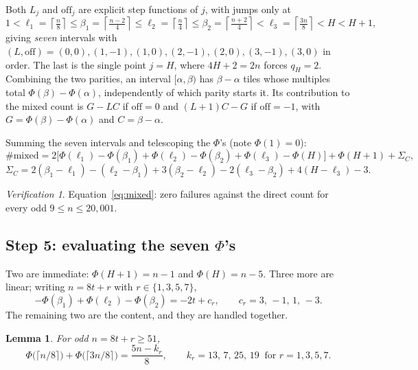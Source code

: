 \documentclass[11pt,reqno]{amsart}
\theoremstyle{plain}
\newtheorem*{lemma}{Lemma}
\theoremstyle{remark}
\newtheorem*{verification}{Verification}
\numberwithin{equation}{section}
\begin{document}
Both $L_j$ and $\mathrm{off}_j$ are explicit step functions of $j$, with jumps
only at
\[
  1 < \ell_1 = \left\lceil \tfrac{n}{8}\right\rceil
    \le \beta_1 = \left\lceil \tfrac{n-2}{4}\right\rceil
    \le \ell_2 = \left\lceil \tfrac{n}{4}\right\rceil
    \le \beta_2 = \left\lceil \tfrac{n+2}{4}\right\rceil
    < \ell_3 = \left\lceil \tfrac{3n}{8}\right\rceil < H < H+1,
\]
giving \emph{seven} intervals with
$(L,\mathrm{off}) = (0,0),(1,-1),(1,0),(2,-1),(2,0),(3,-1),(3,0)$ in order. The
last is the single point $j = H$, where $4H+2 = 2n$ forces $q_H = 2$. Combining
the two parities, an interval $[\alpha,\beta)$ has $\beta-\alpha$ tiles whose
multiples total $\Phi(\beta)-\Phi(\alpha)$, independently of which parity starts
it. Its contribution to the mixed count is $G-LC$ if $\mathrm{off}=0$ and
$(L+1)C-G$ if $\mathrm{off}=-1$, with $G = \Phi(\beta)-\Phi(\alpha)$ and
$C = \beta-\alpha$.

Summing the seven intervals and telescoping the $\Phi$'s (note $\Phi(1)=0$):
\begin{equation}\label{eq:mixed}
  \#\text{mixed} = 2\bigl[\Phi(\ell_1)-\Phi(\beta_1)+\Phi(\ell_2)-\Phi(\beta_2)
                    +\Phi(\ell_3)-\Phi(H)\bigr] + \Phi(H+1) + \Sigma_C,
\end{equation}
\[
  \Sigma_C = 2(\beta_1-\ell_1)-(\ell_2-\beta_1)+3(\beta_2-\ell_2)
             -2(\ell_3-\beta_2)+4(H-\ell_3)-3 .
\]

\begin{verification}
Equation~\eqref{eq:mixed}: zero failures against the direct count for every odd
$9 \le n \le 20{,}001$.
\end{verification}

\subsection{Step 5: evaluating the seven \texorpdfstring{$\Phi$}{Phi}'s}

Two are immediate: $\Phi(H+1) = n-1$ and $\Phi(H) = n-5$. Three more are linear;
writing $n = 8t+r$ with $r \in \{1,3,5,7\}$,
\[
  -\Phi(\beta_1)+\Phi(\ell_2)-\Phi(\beta_2) = -2t + c_r,
  \qquad c_r = 3,\,-1,\,1,\,-3 .
\]
The remaining two are the content, and they are handled together.

\begin{lemma}
For odd $n = 8t+r \ge 51$,
\[
  \Phi\bigl(\lceil n/8\rceil\bigr) + \Phi\bigl(\lceil 3n/8\rceil\bigr)
  = \frac{5n-k_r}{8},
  \qquad k_r = 13,\,7,\,25,\,19 \ \text{ for } r = 1,3,5,7 .
\]
\end{lemma}
\end{document}
